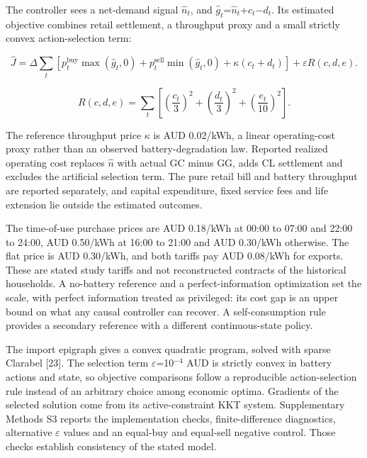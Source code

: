 \documentclass[pdflatex,Numbered,sn-basic]{sn-jnl}
\begin{document}
The controller sees a net-demand signal $\hat{n}_t$, and $\hat{g}_t$=$\hat{n}_t$+$c_t$$-$$d_t$. Its estimated objective combines retail settlement, a throughput proxy and a small strictly convex action-selection term:

\begin{equation}
\hat{J} = \Delta \sum_t \left[ p^{\mathrm{buy}}_t \max(\hat{g}_t,0) + p^{\mathrm{sell}}_t \min(\hat{g}_t,0) + \kappa (c_t + d_t) \right] + \varepsilon R(c,d,e).
\label{eq2}
\end{equation}

\begin{equation}
R(c,d,e) = \sum_t \left[ \left(\frac{c_t}{3}\right)^2 + \left(\frac{d_t}{3}\right)^2 + \left(\frac{e_t}{10}\right)^2 \right].
\label{eq3}
\end{equation}

The reference throughput price $\kappa$ is AUD 0.02/kWh, a linear operating-cost proxy rather than an observed battery-degradation law. Reported realized operating cost replaces $\hat{n}$ with actual GC minus GG, adds CL settlement and excludes the artificial selection term. The pure retail bill and battery throughput are reported separately, and capital expenditure, fixed service fees and life extension lie outside the estimated outcomes.

The time-of-use purchase prices are AUD 0.18/kWh at 00:00 to 07:00 and 22:00 to 24:00, AUD 0.50/kWh at 16:00 to 21:00 and AUD 0.30/kWh otherwise. The flat price is AUD 0.30/kWh, and both tariffs pay AUD 0.08/kWh for exports. These are stated study tariffs and not reconstructed contracts of the historical households. A no-battery reference and a perfect-information optimization set the scale, with perfect information treated as privileged: its cost gap is an upper bound on what any causal controller can recover. A self-consumption rule provides a secondary reference with a different continuous-state policy.

The import epigraph gives a convex quadratic program, solved with sparse Clarabel [23]. The selection term $\varepsilon$=10$^{-4}$ AUD is strictly convex in battery actions and state, so objective comparisons follow a reproducible action-selection rule instead of an arbitrary choice among economic optima. Gradients of the selected solution come from its active-constraint KKT system. Supplementary Methods S3 reports the implementation checks, finite-difference diagnostics, alternative $\varepsilon$ values and an equal-buy and equal-sell negative control. Those checks establish consistency of the stated model.
\end{document}

